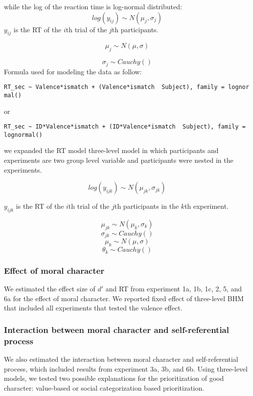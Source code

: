 \documentclass[
  english,
  man]{apa6}
\begin{document}
while the log of the reaction time is log-normal distributed:
\[ log(y_{ij}) \sim N(\mu_{j}, \sigma_{j})\]
\(y_{ij}\) is the RT of the \(i\)th trial of the \(j\)th participants.

\[\mu_{j} \sim N(\mu, \sigma)\]

\[\sigma_{j} \sim Cauchy()\]
Formula used for modeling the data as follow:

\texttt{RT\_sec\ \textasciitilde{}\ Valence*ismatch\ +\ (Valence*ismatch\ \textbar{}\ Subject),\ family\ =\ lognormal()}

or

\texttt{RT\_sec\ \textasciitilde{}\ ID*Valence*ismatch\ +\ (ID*Valence*ismatch\ \textbar{}\ Subject),\ family\ =\ lognormal()}

we expanded the RT model three-level model in which participants and experiments are two group level variable and participants were nested in the experiments.

\[ log(y_{ijk}) \sim N(\mu_{jk}, \sigma_{jk})\]

\(y_{ijk}\) is the RT of the \(i\)th trial of the \(j\)th participants in the \(k\)th experiment.

\[\mu_{jk} \sim N(\mu_{k}, \sigma_{k})\]
\[\sigma_{jk} \sim Cauchy()\]
\[\mu_{k} \sim N(\mu, \sigma)\]
\[\theta_{k} \sim Cauchy()\]

\hypertarget{effect-of-moral-character}{%
\subsubsection{Effect of moral character}\label{effect-of-moral-character}}

We estimated the effect size of \(d'\) and RT from experiment 1a, 1b, 1c, 2, 5, and 6a for the effect of moral character. We reported fixed effect of three-level BHM that included all experiments that tested the valence effect.

\hypertarget{interaction-between-moral-character-and-self-referential-process}{%
\subsubsection{Interaction between moral character and self-referential process}\label{interaction-between-moral-character-and-self-referential-process}}

We also estimated the interaction between moral character and self-referential process, which included results from experiment 3a, 3b, and 6b. Using three-level models, we tested two possible explanations for the prioritization of good character: value-based or social categorization based prioritization.
\end{document}
